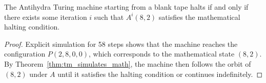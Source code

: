 \begin{theorem}
  \label{thm:antihydra_halts_iff}
  \leanok
  The Antihydra Turing machine starting from a blank tape halts if and only if there exists some iteration $i$ such that $A^i(8, 2)$ satisfies the mathematical halting condition.
  \begin{proof}
    \leanok
    Explicit simulation for 58 steps shows that the machine reaches the configuration $P(2, 8, 0, 0)$, which corresponds to the mathematical state $(8, 2)$. By Theorem~\ref{thm:tm_simulates_math}, the machine then follows the orbit of $(8, 2)$ under $A$ until it satisfies the halting condition or continues indefinitely.
  \end{proof}
\end{theorem}
